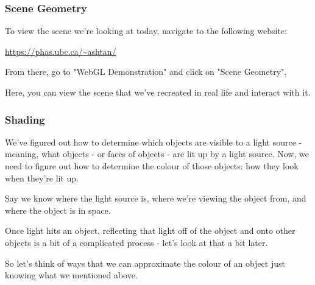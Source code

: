 \documentclass[12pt]{beamer}
\begin{document}
  \begin{frame}
    \frametitle{Scene Geometry}



    To view the scene we're looking at today, navigate to the following website:

    \url{https://phas.ubc.ca/~ashtan/}

    From there, go to "WebGL Demonstration" and click on "Scene Geometry". %

    Here, you can view the scene that we've recreated in real life and interact with it.

  \end{frame}


  \begin{frame}
    \frametitle{Shading}
    We've figured out how to determine which objects are visible to a light source - meaning, what objects - or faces of objects - are lit up by a light source.
    Now, we need to figure out how to determine the colour of those objects: how they look when they're lit up.

    Say we know where the light source is, where we're viewing the object from, and where the object is in space.

    Once light hits an object, reflecting that light off of the object and onto other objects is a bit of a complicated process - let's look at that a bit later.

    So let's think of ways that we can approximate the colour of an object just knowing what we mentioned above.

  \end{frame}
\end{document}
